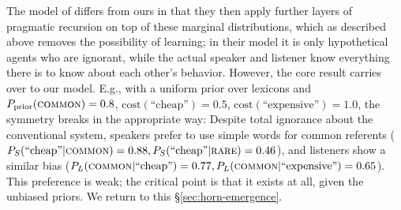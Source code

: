 \documentclass{article} %
\begin{document}

%
%


The model of \cite{bergen2012} differs from ours in that they then
apply further layers of pragmatic recursion on top of these marginal
distributions, which as described above removes the possibility of
learning; in their model it is only hypothetical agents who are
ignorant, while the actual speaker and listener know everything there
is to know about each other's behavior. However, the core result
carries over to our model. E.g., with a uniform prior over
lexicons and $P_\text{prior}(\text{\textsc{common}}) = 0.8$,
$\text{cost}(\text{``cheap''}) = 0.5$,
$\text{cost}(\text{``expensive''}) = 1.0$, the symmetry breaks in the
appropriate way: Despite total ignorance about the conventional
system, speakers prefer to use simple words for common referents
($P_S(\text{``cheap''} | \text{\textsc{common}}) = 0.88,
P_S(\text{``cheap''} | \text{\textsc{rare}}) = 0.46$), and listeners
show a similar bias ($P_L(\text{\textsc{common}} | \text{``cheap''}) =
0.77, P_L(\text{\textsc{common}} | \text{``expensive''}) =
0.65$). This preference is weak; the critical point is
that it exists at all, given the unbiased priors. We return to this
\S\ref{sec:horn-emergence}.



\end{document}
